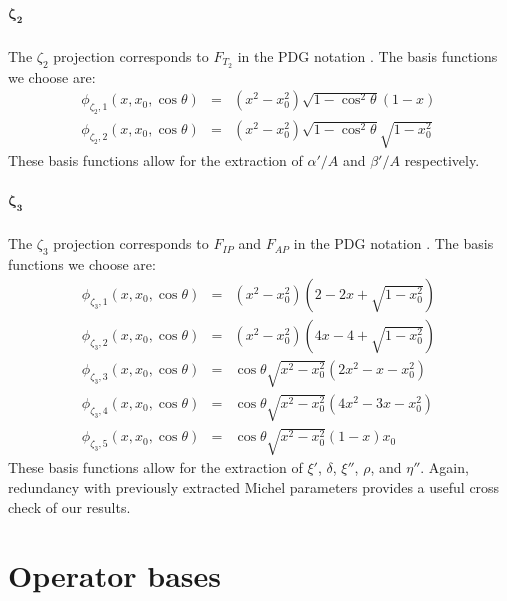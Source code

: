 \paragraph*{$\mathbf{\zeta_2}$}
The $\zeta_2$ projection corresponds to $F_{T_2}$ in the PDG notation \cite{particle2024review}. The basis functions we choose are:
%
\begin{eqnarray}
\phi_{\zeta_2,1}(x,x_0,\cos\theta)&=&(x^2-x_0^2)\sqrt{1-\cos^2\theta}(1-x)\, \\
\phi_{\zeta_2,2}(x,x_0,\cos\theta)&=&(x^2-x_0^2)\sqrt{1-\cos^2\theta}\sqrt{1-x_0^2}\, 
\end{eqnarray}
%
These basis functions allow for the extraction of $\alpha'/A$ and $\beta'/A$ respectively.



\paragraph*{$\mathbf{\zeta_3}$}
The $\zeta_3$ projection corresponds to $F_{IP}$ and $F_{AP}$ in the PDG notation \cite{particle2024review}. The basis functions we choose are:
%
\begin{eqnarray}
\phi_{\zeta_3,1}(x,x_0,\cos\theta)&=&(x^2-x_0^2)(2-2x+\sqrt{1-x_0^2})\, \\
\phi_{\zeta_3,2}(x,x_0,\cos\theta)&=&(x^2-x_0^2)(4x-4+\sqrt{1-x_0^2})\,\\
\phi_{\zeta_3,3}(x,x_0,\cos\theta)&=&\cos\theta\sqrt{x^2-x_0^2}(2x^2-x-x_0^2)\, \\
\phi_{\zeta_3,4}(x,x_0,\cos\theta)&=&\cos\theta\sqrt{x^2-x_0^2}(4x^2-3x-x_0^2)\, \\
\phi_{\zeta_3,5}(x,x_0,\cos\theta)&=&\cos\theta\sqrt{x^2-x_0^2}(1-x)x_0\, 
\end{eqnarray}
%
These basis functions allow for the extraction of $\xi'$, $\delta$, $\xi''$, $\rho$, and $\eta''$. Again, redundancy with previously extracted Michel parameters provides a useful cross check of our results.







\chapter{Operator bases}\label{sec:base}
